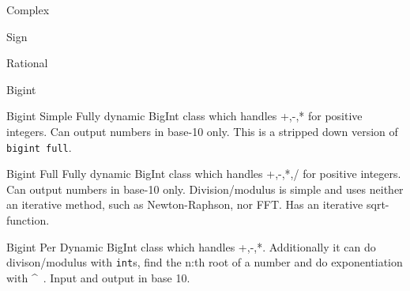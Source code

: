 
\begin{algorithm}{Complex}
\end{algorithm}

\begin{algorithm}{Sign}
\end{algorithm}

\begin{algorithm}{Rational}
\end{algorithm}

\begin{algorithm}{Bigint}
\end{algorithm}

\begin{algorithm}{Bigint Simple}
\desc
Fully dynamic BigInt class which handles +,-,* for
positive integers. Can output numbers in base-10 only. This is a stripped
down version of {\tt bigint full}.
\end{algorithm}

\begin{algorithm}{Bigint Full}
\desc
Fully dynamic BigInt class which handles +,-,*,/ for
positive integers. Can output numbers in base-10 only. Division/modulus is
simple and uses neither an iterative method, such as Newton-Raphson,
nor FFT. Has an iterative sqrt-function.
\end{algorithm}

\begin{algorithm}{Bigint Per}
\desc
Dynamic BigInt class which handles +,-,*. Additionally
it can do divison/modulus with \texttt{int}s, find the n:th root of a number and
do exponentiation with \^~. Input and output in base 10.
\end{algorithm}
